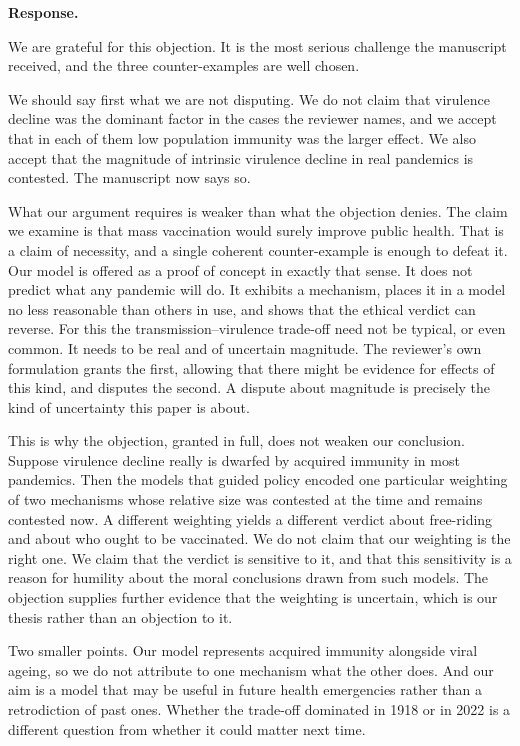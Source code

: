 \documentclass[a4paper,12pt]{article}
\newcommand{\reply}[1]{#1}
\newcommand{\rlabel}[1]{\par\medskip\noindent\textbf{#1}\par\nobreak}
\begin{document}
\rlabel{Response.}
\reply{We are grateful for this objection. It is the most serious challenge the
manuscript received, and the three counter-examples are well chosen.

We should say first what we are not disputing. We do not claim that virulence
decline was the dominant factor in the cases the reviewer names, and we accept
that in each of them low population immunity was the larger effect. We also
accept that the magnitude of intrinsic virulence decline in real pandemics is
contested. The manuscript now says so.

What our argument requires is weaker than what the objection denies. The claim
we examine is that mass vaccination would surely improve public health. That is
a claim of necessity, and a single coherent counter-example is enough to defeat
it. Our model is offered as a proof of concept in exactly that sense. It does
not predict what any pandemic will do. It exhibits a mechanism, places it in a
model no less reasonable than others in use, and shows that the ethical verdict
can reverse. For this the transmission--virulence trade-off need not be
typical, or even common. It needs to be real and of uncertain magnitude. The
reviewer's own formulation grants the first, allowing that there might be
evidence for effects of this kind, and disputes the second. A dispute about
magnitude is precisely the kind of uncertainty this paper is about.

This is why the objection, granted in full, does not weaken our conclusion.
Suppose virulence decline really is dwarfed by acquired immunity in most
pandemics. Then the models that guided policy encoded one particular weighting
of two mechanisms whose relative size was contested at the time and remains
contested now. A different weighting yields a different verdict about
free-riding and about who ought to be vaccinated. We do not claim that our
weighting is the right one. We claim that the verdict is sensitive to it, and
that this sensitivity is a reason for humility about the moral conclusions
drawn from such models. The objection supplies further evidence that the
weighting is uncertain, which is our thesis rather than an objection to it.

Two smaller points. Our model represents acquired immunity alongside viral
ageing, so we do not attribute to one mechanism what the other does. And our
aim is a model that may be useful in future health emergencies rather than a
retrodiction of past ones. Whether the trade-off dominated in 1918 or in 2022
is a different question from whether it could matter next time.}
\end{document}
